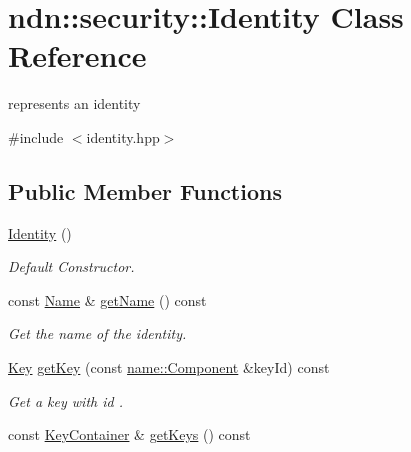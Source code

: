 \hypertarget{classndn_1_1security_1_1Identity}{}\section{ndn\+:\+:security\+:\+:Identity Class Reference}
\label{classndn_1_1security_1_1Identity}


represents an identity  




{\ttfamily \#include $<$identity.\+hpp$>$}

\subsection*{Public Member Functions}
\begin{DoxyCompactItemize}
\item 
\hyperlink{classndn_1_1security_1_1Identity_aef7673e7ae7900a5550b247484b6e270}{Identity} ()
\begin{DoxyCompactList}\small\item\em Default Constructor. \end{DoxyCompactList}\item 
const \hyperlink{classndn_1_1Name}{Name} \& \hyperlink{classndn_1_1security_1_1Identity_a02aad28cf65c118a2b88350db69b2da3}{get\+Name} () const\hypertarget{classndn_1_1security_1_1Identity_a02aad28cf65c118a2b88350db69b2da3}{}\label{classndn_1_1security_1_1Identity_a02aad28cf65c118a2b88350db69b2da3}

\begin{DoxyCompactList}\small\item\em Get the name of the identity. \end{DoxyCompactList}\item 
\hyperlink{classndn_1_1security_1_1Key}{Key} \hyperlink{classndn_1_1security_1_1Identity_a9645d0e8550da95f067d18b95150f208}{get\+Key} (const \hyperlink{classndn_1_1name_1_1Component}{name\+::\+Component} \&key\+Id) const
\begin{DoxyCompactList}\small\item\em Get a key with id . \end{DoxyCompactList}\item 
const \hyperlink{classndn_1_1security_1_1KeyContainer}{Key\+Container} \& \hyperlink{classndn_1_1security_1_1Identity_a3e4e9662b6b183861a4192ed057e4621}{get\+Keys} () const\hypertarget{classndn_1_1security_1_1Identity_a3e4e9662b6b183861a4192ed057e4621}{}\label{classndn_1_1security_1_1Identity_a3e4e9662b6b183861a4192ed057e4621}


\end{DoxyCompactItemize}
